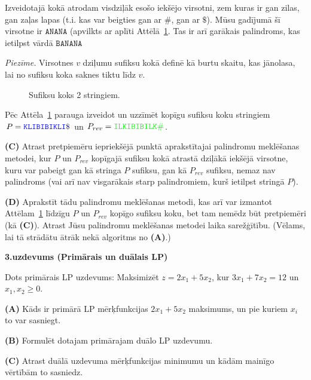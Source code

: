 \documentclass[a4paper,12pt]{article}
\begin{document}
Izveidotajā kokā atrodam visdziļāk esošo 
iekšējo virsotni, zem kuras ir gan zilas, gan zaļas lapas (t.i. kas var beigties 
gan ar $\texttt{\#}$, gan ar $\texttt{\$}$).
Mūsu gadījumā šī virsotne ir $\mathtt{ANANA}$ (apvilkts ar aplīti Attēlā~\ref{fig:banana-suffix-tree}.
Tas ir arī garākais palindroms, kas ietilpst vārdā $\mathtt{BANANA}$

\vspace{5pt} 
{\em Piezīme.} Virsotnes $v$ dziļumu sufiksu kokā definē kā burtu skaitu, kas jānolasa, lai 
no sufiksu koka saknes tiktu līdz $v$.


\begin{figure}[!htb]
\caption{\label{fig:banana-suffix-tree} Sufiksu koks 2 stringiem.}
\end{figure}

Pēc Attēla~\ref{fig:banana-suffix-tree} parauga izveidot un uzzīmēt kopīgu sufiksu koku stringiem\\
$P = \textcolor{blue}{\mathtt{KLIBIBIKLI\$}}$ un 
$P_{rev} = \textcolor{green}{\mathtt{ILKIBIBILK\#}}$. 


\vspace{5pt}
{\bf (C)} Atrast pretpiemēru iepriekšējā punktā aprakstītajai
palindromu meklēšanas metodei, kur $P$ un $P_{rev}$ kopīgajā sufiksu kokā
atrastā dziļākā iek\-šē\-jā virsotne, 
kuru var pabeigt gan kā stringa $P$ sufiksu, gan kā $P_{rev}$ sufiksu, nemaz nav palindroms
(vai arī nav visgarākais starp palindromiem, kurš ietilpst stringā $P$).  

\vspace{5pt}
{\bf (D)} Aprakstīt tādu palindromu meklēšanas me\-to\-di, kas arī 
var izmantot Attēlam~\ref{fig:banana-suffix-tree} līdzīgu 
$P$ un $P_{rev}$ kopīgo sufiksu koku, bet tam nemēdz būt pretpiemēri (kā {\bf (C)}). 
Atrast Jūsu palindromu meklēšanas metodei laika sarežģītību.
(Vēlams, lai tā strādātu ātrāk nekā algoritms no {\bf (A)}.)



\vspace{20pt}
{\bf 3.uzdevums (Primārais un duālais LP)}

Dots primārais LP uzdevums: Maksimizēt $z = 2x_1 + 5x_2$, 
kur $3x_1 + 7x_2 = 12$ un $x_1,x_2 \geq 0$.

\vspace{5pt}
{\bf (A)} Kāds ir primārā LP mērķfunkcijas $2x_1 + 5x_2$ maksimums, un pie kuriem $x_i$ to var sasniegt.

\vspace{5pt}
{\bf (B)} Formulēt dotajam primārajam duālo LP uzdevumu.

\vspace{5pt}
{\bf (C)} 
Atrast duālā uzdevuma mērķfunkcijas minimumu un kādām mainīgo vērtībām to sasniedz.
\end{document}
